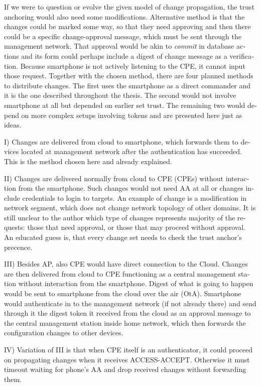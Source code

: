 \documentclass[12pt,a4paper,english]{tutthesis}
\begin{document}
\begin{otherlanguage}{english}
If we were to question or evolve the given model of change
propagation, the trust anchoring would also need some modifications.
Alternative method is that the changes could be marked some way, so
that they need approving and then there could be a specific
change-approval message, which must be sent through the management
network. That approval would be akin to \emph{commit} in database actions
and its form could perhaps include a digest of change message as a verification.
Because smartphone is not actively listening to the CPE, it cannot input
those request. Together with the chosen method, there are four planned
methods to distribute changes. The first uses the smartphone as a
direct commander and it is the one described throughout the thesis.
The second would not involve smartphone at all but depended on
earlier set trust. The remaining two would depend on more complex
setups involving tokens and are presented here just as ideas.


I) Changes are delivered from cloud to smartphone, which forwards them
   to devices located at management network after the
   authentication has succeeded. This is the method chosen here and
   already explained.

II) Changes are delivered normally from cloud to CPE (CPEs) without
   interaction from the smartphone. Such changes would not need AA at
   all or changes include credentials to login to targets. An example
   of change is a modification in network segment, which does not
   change network topology of other domains.  It is still unclear to
   the author which type of changes represents majority of the
   requests: those that need approval, or those that may proceed
   without approval. An educated guess is, that every change set needs
   to check the trust anchor's precence.



III) Besides AP, also CPE would have direct connection to the
   Cloud. Changes are then delivered from cloud to CPE functioning as a central
   management station without interaction from the smartphone.  Digest
   of what is going to happen would be sent to smartphone from the
   cloud over the air (OtA). Smartphone would authenticate in to the
   management network (if not already there) and send through it the
   digest token it received from the cloud as an approval message to
   the central management station inside home network, which then
   forwards the configuration changes to other devices.

IV) Variation of III is that when CPE itself is an authenticator, it
   could proceed on propagating changes when it receives
   ACCESS-ACCEPT. Otherwise it must timeout waiting for phone's AA and
   drop received changes without forwarding them.



\end{otherlanguage}
\end{document}
